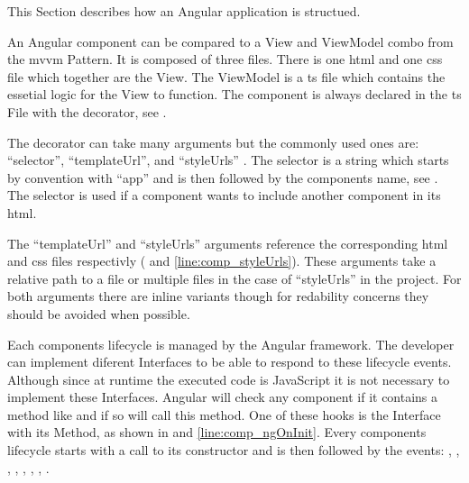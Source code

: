 

This Section describes how an Angular application is structued.


An Angular component can be compared to a View and ViewModel combo from the \gls{mvvm} Pattern. It is composed of three files. There is one \gls{html} and one \gls{css} file which together are the View. The ViewModel is a \gls{ts} file which contains the essetial logic for the View to function. The component is always declared in the \gls{ts} File with the  decorator, see .


The  decorator can take many arguments but the commonly used ones are: \enquote{selector}, \enquote{templateUrl}, and \enquote{styleUrls} \cite{ngcomponent}. The selector is a string which starts by convention with \enquote{app} and is then followed by the components name, see . The selector is used if a component wants to include another component in its \gls{html}.

The \enquote{templateUrl} and \enquote{styleUrls} arguments reference the corresponding \gls{html} and \gls{css} files respectivly ( and \ref{line:comp_styleUrls}). These arguments take a relative path to a file or multiple files in the case of \enquote{styleUrls} in the project. For both arguments there are inline variants though for redability concerns they should be avoided when possible.

Each components lifecycle is managed by the Angular framework. The developer can implement diferent Interfaces to be able to respond to these lifecycle events. Although since at runtime the executed code is JavaScript it is not necessary to implement these Interfaces. Angular will check any component if it contains a method like \zB {} and if so will call this method. One of these hooks is the  Interface with its  Method, as shown in  and \ref{line:comp_ngOnInit}. Every components lifecycle starts with a call to its constructor and is then followed by the events: , , , , , , , . \cite{angularLifecycleHooks}

